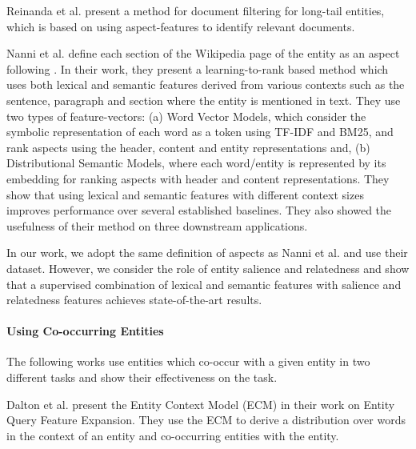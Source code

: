 \documentclass[sigconf,authordraft]{acmart}
\begin{document}
Reinanda et al. \cite{reinanda2016document} present a method for document filtering for long-tail entities, which is based on using aspect-features to identify relevant documents. 

Nanni et al. \cite{nanni2018entity} define each section of the Wikipedia page of the entity as an aspect following \cite{fetahu2015automated,banerjee2015wikikreator,reinanda2016document}.
In their work, they present a learning-to-rank based method which uses both lexical and semantic features derived from various contexts such as the sentence, paragraph and section where the entity is mentioned in text. They use two types of feature-vectors: (a) Word Vector Models, which consider the symbolic representation of each word as a token using TF-IDF and BM25, and rank aspects using the header, content and entity representations and, (b) Distributional Semantic Models, where each word/entity is represented by its embedding for ranking aspects with header and content representations. They show that using lexical and semantic features with different context sizes improves performance over several established baselines. They also showed the usefulness of their method on three downstream applications.  



In our work, we adopt the same definition of aspects as Nanni  et al. \cite{nanni2018entity} and use their dataset. However, we consider the role of entity salience and relatedness and show that a supervised combination of lexical and semantic features with salience and relatedness features achieves state-of-the-art results.

\paragraph{\textbf{Using Co-occurring Entities}}
The following works use entities which co-occur with a given entity in two different tasks and show their effectiveness on the task. 

Dalton et al. \cite{dalton2014entity} present the Entity Context Model (ECM) in their work on Entity Query Feature Expansion. They use the ECM to derive a distribution over words in the context of an entity and co-occurring entities with the entity.
\end{document}
